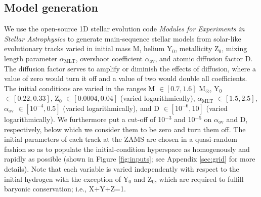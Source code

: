 \documentclass[manuscript]{aastex}
\begin{document}
\subsection{Model generation}
\label{sec:models}
We use the open-source 1D stellar evolution code \emph{Modules for Experiments in Stellar Astrophysics} \citep[MESA,][]{Paxton2011} to generate main-sequence stellar models from solar-like evolutionary tracks varied in initial mass M, helium Y$_0$, metallicity Z$_0$, mixing length parameter $\alpha_{\text{MLT}}$, overshoot coefficient $\alpha_{\text{ov}}$, and atomic diffusion factor D. The diffusion factor serves to amplify or diminish the effects of diffusion, where a value of zero would turn it off and a value of two would double all coefficients. The initial conditions are varied in the ranges M $\in [0.7, 1.6]$ M$_\odot$, Y$_0$ $\in [0.22, 0.33]$, Z$_0$ $\in [0.0004, 0.04]$ (varied logarithmically), $\alpha_{\text{MLT}}$ $\in [1.5, 2.5]$, $\alpha_{\text{ov}}$ $\in [10^{-4}, 0.5]$ (varied logarithmically), and D $\in [10^{-6}, 10]$ (varied logarithmically). We furthermore put a cut-off of 10$^{-3}$ and 10$^{-5}$ on $\alpha_{\text{ov}}$ and D, respectively, below which we consider them to be zero and turn them off. The initial parameters of each track at the ZAMS are chosen in a quasi-random fashion so as to populate the initial-condition hyperspace as homogenously and rapidly as possible (shown in Figure \ref{fig:inputs}; see Appendix \ref{sec:grid} for more details). Note that each variable is varied independently with respect to the initial hydrogen with the exception of Y$_0$ and Z$_0$, which are required to fulfill baryonic conservation; i.e., X+Y+Z=1. 
\end{document}
